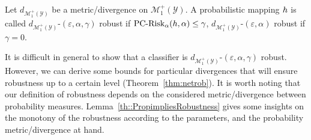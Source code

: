 \begin{definition}
\label{def::GeneralizedRobustness}
Let $d_{\mathcal{M}_1^+(\mathcal{Y})}$ be a metric/divergence on $\mathcal{M}_1^+(\mathcal{Y})$. A probabilistic mapping $h$ is called
 $d_{\mathcal{M}_1^+(\mathcal{Y})}$-$(\varepsilon, \alpha, \gamma)$ robust if
$\text{PC-Risk}_{\alpha}(h,\alpha) \leq \gamma$, $d_{\mathcal{M}_1^+(\mathcal{Y})}$-$(\varepsilon, \alpha)$ robust if $\gamma = 0$.
\end{definition}


It is difficult in general to show that a classifier is $d_{\mathcal{M}_1^+(\mathcal{Y})}$-$(\varepsilon, \alpha, \gamma)$ robust. However, we can  derive some bounds for particular divergences that will ensure robustness up to a certain level (Theorem~\ref{thm:netrob}). It is worth noting that our definition of robustness depends
on the considered metric/divergence between probability measures. Lemma~\ref{th::PropimpliesRobustness} gives some insights on the monotony of the robustness according to the parameters, and the probability metric/divergence at hand.








